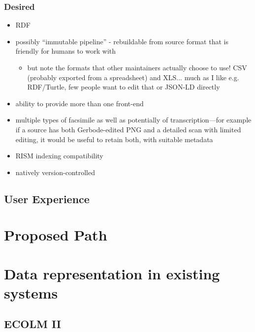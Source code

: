 \documentclass[9pt,twocolumn]{extarticle}
\begin{document}
\begin{sloppypar}
\begin{itemize}
  \end{itemize}

  \subsubsection{Desired}
  
  \begin{itemize}
  \item RDF
  \item possibly ``immutable pipeline'' - rebuildable from source
    format that is friendly for humans to work with
    \begin{itemize}
      \item but note the formats that other maintainers actually choose to
        use! CSV (probably exported from a spreadsheet) and
        XLS... much as I like e.g. RDF/Turtle, few people want to edit
        that or JSON-LD directly
    \end{itemize}
  \item ability to provide more than one front-end
  \item multiple types of facsimile as well as potentially of
    transcription---for example if a source has both Gerbode-edited
    PNG and a detailed scan with limited editing, it would be useful
    to retain both, with suitable metadata
  \item RISM indexing compatibility
  \item natively version-controlled
  \end{itemize}

  
  \subsection{User Experience}

  \section{Proposed Path}

  \clearpage

  \section{Data representation in existing systems}

  \subsection{ECOLM II}\label{ecolm-data}
  

\end{sloppypar}
\end{document}
